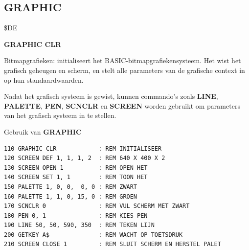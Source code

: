 \newpage
\subsection{GRAPHIC}
\begin{description}[leftmargin=2cm,style=nextline]
\item [Token:]    \$DE

\item [Formaat:]   {\bf GRAPHIC CLR}

\item [Gebruik:]    Bitmapgrafieken: initialiseert het BASIC-bitmapgrafiekensysteem. Het wist het grafisch geheugen en scherm, en stelt alle parameters van de grafische context in op hun standaardwaarden.

                  Nadat het grafisch systeem is gewist, kunnen commando's zoals {\bf LINE}, {\bf PALETTE}, {\bf PEN}, {\bf SCNCLR} en {\bf SCREEN} worden gebruikt om parameters van het grafisch systeem in te stellen.

\item [Voorbeeld:]  Gebruik van {\bf GRAPHIC}

\begin{tcolorbox}[colback=black,coltext=white]
\verbatimfont{\codefont}
\begin{verbatim}
110 GRAPHIC CLR            : REM INITIALISEER
120 SCREEN DEF 1, 1, 1, 2  : REM 640 X 400 X 2
130 SCREEN OPEN 1          : REM OPEN HET
140 SCREEN SET 1, 1        : REM TOON HET
150 PALETTE 1, 0, 0,  0, 0 : REM ZWART
160 PALETTE 1, 1, 0, 15, 0 : REM GROEN
170 SCNCLR 0               : REM VUL SCHERM MET ZWART
180 PEN 0, 1               : REM KIES PEN
190 LINE 50, 50, 590, 350  : REM TEKEN LIJN
200 GETKEY A$              : REM WACHT OP TOETSDRUK
210 SCREEN CLOSE 1         : REM SLUIT SCHERM EN HERSTEL PALET
\end{verbatim}
\end{tcolorbox}
\end{description}



\newpage
